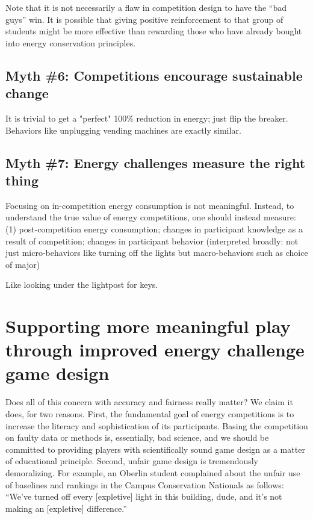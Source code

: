 \documentclass[jou]{apa} %
\begin{document}
Note that it is not necessarily a flaw in competition design to have the ``bad guys''
win.  It is possible that giving positive reinforcement to that group of students might be
more effective than rewarding those who have already bought into energy conservation
principles. 


\subsection{Myth \#6: Competitions encourage sustainable change}

It is trivial to get a "perfect" 100\% reduction in energy; just flip the breaker.
Behaviors like unplugging vending machines are exactly similar.


\subsection{Myth \#7: Energy challenges measure the right thing}

Focusing on in-competition energy consumption is not meaningful.  Instead, to understand
the true value of energy competitions, one should instead measure: (1) post-competition
energy consumption; changes in participant knowledge as a result of competition; changes
in participant behavior (interpreted broadly: not just micro-behaviors like turning off
the lights but macro-behaviors such as choice of major)

Like looking under the lightpost for keys.

\section{Supporting more meaningful play through improved energy challenge game design}

Does all of this concern with accuracy and fairness really matter?  We claim it does, for
two reasons.  First, the fundamental goal of energy competitions is to increase the
literacy and sophistication of its participants.  Basing the competition on faulty data or
methods is, essentially, bad science, and we should be committed to providing players with
scientifically sound game design as a matter of educational principle.  Second, unfair
game design is tremendously demoralizing.  For example, an Oberlin student complained
about the unfair use of baselines and rankings in the Campus Conservation Nationals as
follows: ``We've turned off every [expletive] light in this building, dude, and it's not making
an [expletive] difference.''
\end{document}
